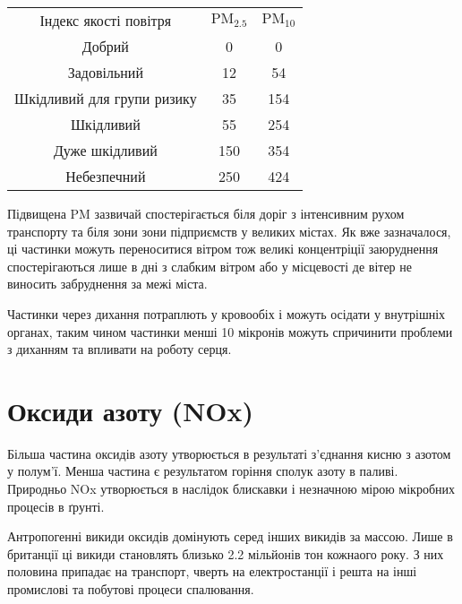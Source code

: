 \begin{center}
    \begin{tabular}{c c c}
        Індекс якості повітря & 
        $\mathrm{PM}_{2.5}$ & $\mathrm{PM}_{10}$ \\
        \cellcolor{green}
        Добрий & 0 & 0\\
        \cellcolor{yellow}
        Задовільний & 12 & 54\\
        \cellcolor{orange}
        Шкідливий для групи ризику & 35 & 154\\
        \cellcolor{red}
        Шкідливий & 55 & 254\\
        \cellcolor{Mahogany}
        Дуже шкідливий & 150 & 354\\
        \cellcolor{Sepia}
        Небезпечний & 250 & 424\\
    \end{tabular}
    
    \vspace{1cm}
\end{center}


Підвищена PM зазвичай спостерігається біля доріг з інтенсивним рухом транспорту та
біля зони зони підприємств у великих містах. Як вже зазначалося, ці частинки можуть 
переноситися вітром тож великі концентріції заюруднення спостерігаються лише в дні з 
слабким вітром або у місцевості де вітер не виносить забруднення за межі міста.

Частинки через дихання потраплють у кровообіх і можуть осідати у внутрішніх органах, 
таким чином частинки менші 10 мікронів можуть спричинити проблеми з диханням та 
впливати на роботу серця.\cite{noauthor_dusts_nodate}

\section{Оксиди азоту (NOx)}

Більша частина оксидів азоту утворюється в результаті з'єднання кисню з азотом у полум'ї. 
Менша частина є результатом горіння сполук азоту в паливі. Природньо NOx утворюється в наслідок 
блискавки і незначною мірою мікробних процесів в ґрунті.

Антропогенні викиди оксидів домінують серед інших викидів за массою. Лише в британції ці викиди 
становлять близько 2.2 мільйонів тон кожнаого року. З них половина припадає на транспорт, 
чверть на електростанції і решта на інші промислові та побутові процеси спалювання.

